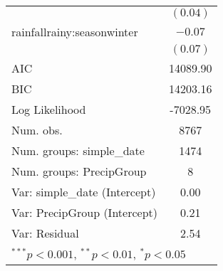 \begin{table}
\begin{center}
\begin{tabular}{l c }
                                  & $(0.04)$      \\
rainfallrainy:seasonwinter        & $-0.07$       \\
                                  & $(0.07)$      \\
\hline
AIC                               & 14089.90      \\
BIC                               & 14203.16      \\
Log Likelihood                    & -7028.95      \\
Num. obs.                         & 8767          \\
Num. groups: simple_date          & 1474          \\
Num. groups: PrecipGroup          & 8             \\
Var: simple_date (Intercept)      & 0.00          \\
Var: PrecipGroup (Intercept)      & 0.21          \\
Var: Residual                     & 2.54          \\
\hline
\multicolumn{2}{l}{\scriptsize{$^{***}p<0.001$, $^{**}p<0.01$, $^*p<0.05$}}
\end{tabular}
\label{table:soil_moisture_model}
\end{center}
\end{table}
